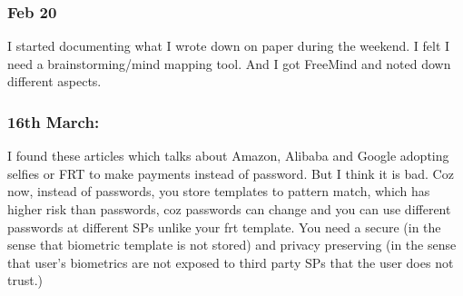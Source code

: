 \documentclass[11pt]{article}
\begin{document}
\subsubsection*{Feb 20}
I started documenting what I wrote down on paper during the weekend. I felt I need a brainstorming/mind mapping tool. And I got FreeMind and noted 
down different aspects.\\

\subsubsection*{16th March:}
I found these articles which talks about Amazon, Alibaba and Google adopting selfies or FRT to make payments instead of password. But I think it is 
bad. Coz now, instead of passwords, you store templates to pattern match, which has higher risk than passwords, coz passwords can change and you can 
use different passwords at different SPs unlike your frt template. You need a secure (in the sense that biometric template is not stored) and 
privacy preserving (in the sense that user's biometrics are not exposed to third party SPs that the user does not trust.)\\
\end{document}
